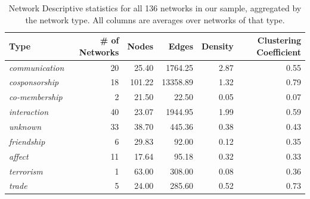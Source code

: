 \documentclass[3p,times]{elsarticle}
\begin{document}
\begin{table}[ht]
\centering
\caption{\label{tab:descriptive stats by type} Network Descriptive statistics for all 136 networks in our sample, aggregated by the network type. All columns are averages over networks of that type.}
\begin{tabular}{lrrrrr}
  \toprule
 \textbf{Type} & \textbf{\# of Networks} & \textbf{Nodes} & \textbf{Edges} & \textbf{Density} & \textbf{Clustering Coefficient} \\ 
  \midrule
  \emph{communication} & 20 & 25.40 & 1764.25 & 2.87 & 0.55 \\ 
  \emph{cosponsorship} & 18 & 101.22 & 13358.89 & 1.32 & 0.79 \\ 
  \emph{co-membership} & 2 & 21.50 & 22.50 & 0.05 & 0.07 \\ 
  \emph{interaction} & 40 & 23.07 & 1944.95 & 1.99 & 0.59 \\ 
  \emph{unknown} & 33 & 38.70 & 445.36 & 0.38 & 0.43 \\ 
  \emph{friendship} & 6 & 29.83 & 92.00 & 0.12 & 0.35 \\ 
  \emph{affect} & 11 & 17.64 & 95.18 & 0.32 & 0.33 \\ 
  \emph{terrorism} & 1 & 63.00 & 308.00 & 0.08 & 0.36 \\ 
  \emph{trade} & 5 & 24.00 & 285.60 & 0.52 & 0.73 \\ 
   \bottomrule
\end{tabular}
\end{table}

	
\end{document}
